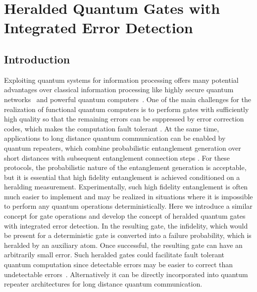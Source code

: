 \chapter{Heralded Quantum Gates with Integrated Error Detection}
\label{ch:Borregaard_PRL2015}

\section{Introduction}

Exploiting quantum systems for information processing offers many potential
advantages over classical information processing like highly secure quantum
networks~\cite{cirac,kimble, duan3} and powerful quantum
computers~\cite{ladd,shor,feynman}. One of the main challenges for the
realization of functional quantum computers is to perform gates with
sufficiently high quality so that the remaining errors can be suppressed by
error correction codes, which makes the computation fault tolerant
\cite{knill2}. At the same time, applications to long distance quantum
communication can be enabled by quantum repeaters, which combine probabilistic
entanglement generation over short distances with subsequent entanglement
connection steps \cite{duan3}. For these protocols, the probabilistic nature of
the entanglement generation is acceptable, but it is essential that high
fidelity entanglement is achieved conditioned on a heralding measurement.
Experimentally, such high fidelity entanglement is often much easier to
implement and may be realized in situations where it is impossible to perform
any quantum operations deterministically. Here we introduce a similar concept
for gate operations and develop the concept of  heralded quantum gates  with
integrated error detection. In the resulting gate, the infidelity, which would
be present for a deterministic gate is converted into a failure probability,
which is heralded by an auxiliary atom. Once successful, the resulting gate can
have an arbitrarily small error. Such heralded gates could facilitate fault
tolerant quantum computation since detectable errors may be easier to correct
than undetectable errors~\cite{grassi,ralph05,varnava}.  Alternatively it can be
directly incorporated into quantum repeater architectures for long distance
quantum communication.

